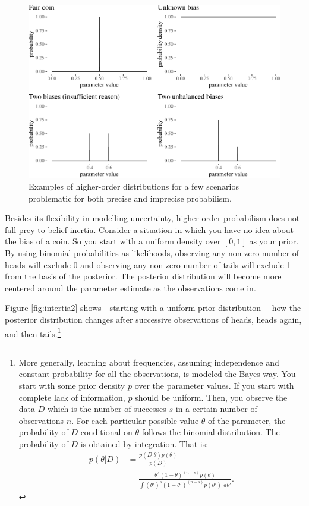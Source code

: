 \documentclass[
  10pt,
  dvipsnames,enabledeprecatedfontcommands]{scrartcl}
\begin{document}
\begin{figure}[t]

\begin{center}\includegraphics[width=0.8\linewidth]{imprecision_philosophical_paper._files/figure-latex/fig:evidenceResponse2-1} \end{center}
\caption{Examples of higher-order distributions for a few  scenarios problematic for both precise and imprecise probabilism.}
\label{fig:evidenceResponse}
\end{figure}

Besides its flexibility in modelling uncertainty, higher-order
probabilism does not fall prey to belief inertia. Consider a situation
in which you have no idea about the bias of a coin. So you start with a
uniform density over \([0,1]\) as your prior. By using binomial
probabilities as likelihoods, observing any non-zero number of heads
will exclude 0 and observing any non-zero number of tails will exclude 1
from the basis of the posterior. The posterior distribution will become
more centered around the parameter estimate as the observations come in.

Figure \ref{fig:intertia2} shows---starting with a uniform prior
distribution--- how the posterior distribution changes after successive
observations of heads, heads again, and then tails.\footnote{More
  generally, learning about frequencies, assuming independence and
  constant probability for all the observations, is modeled the Bayes
  way. You start with some prior density \(p\) over the parameter
  values. If you start with complete lack of information, \(p\) should
  be uniform. Then, you observe the data \(D\) which is the number of
  successes \(s\) in a certain number of observations \(n\). For each
  particular possible value \(\theta\) of the parameter, the probability
  of \(D\) conditional on \(\theta\) follows the binomial distribution.
  The probability of \(D\) is obtained by integration. That is:
  \begin{align*}
  p(\theta \vert D) & = \frac{p(D\vert \theta)p(\theta)}{p(D)}\\
  & = \frac{\theta^s (1-\theta)^{(n - s)}p(\theta)}{\int (\theta')^s (1-\theta')^{(n - s)}p(\theta')\,\, d\theta'}.
  \end{align*}}
\end{document}
